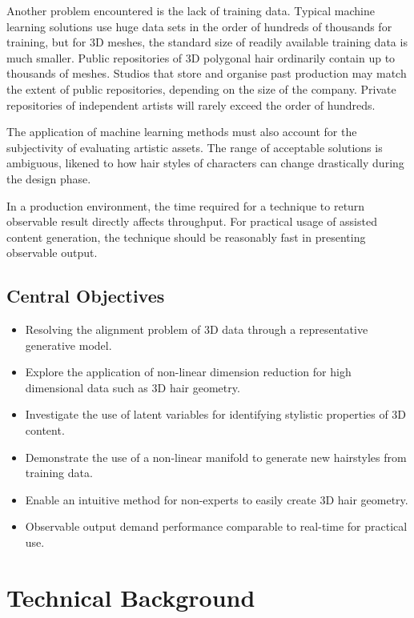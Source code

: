 \documentclass[ %
author={Dillon Keith Diep},
supervisor={Dr. Carl Henrik Ek},
degree={MEng},
title={ART-CG:},
subtitle={Assisted Real-time Content Generation of 3D Hair by Learning Manifolds},
type={Research},
year={2017} ]{dissertation}
\begin{document}
Another problem encountered is the lack of training data. Typical machine learning solutions use huge data sets in the order of hundreds of thousands for training, but for 3D meshes, the standard size of readily available training data is much smaller. Public repositories of 3D polygonal hair ordinarily contain up to thousands of meshes. \cite{tsr} Studios that store and organise past production may match the extent of public repositories, depending on the size of the company. Private repositories of independent artists will rarely exceed the order of hundreds.

The application of machine learning methods must also account for the subjectivity of evaluating artistic assets. The range of acceptable solutions is ambiguous, likened to how hair styles of characters can change drastically during the design phase.

In a production environment, the time required for a technique to return observable result directly affects throughput. For practical usage of assisted content generation, the technique should be reasonably fast in presenting observable output.

\section{Central Objectives}
\begin{itemize}
	\item Resolving the alignment problem of 3D data through a representative generative model.
	\item Explore the application of non-linear dimension reduction for high dimensional data such as 3D hair geometry.
	\item Investigate the use of latent variables for identifying stylistic properties of 3D content.
	\item Demonstrate the use of a non-linear manifold to generate new hairstyles from training data.
	\item Enable an intuitive method for non-experts to easily create 3D hair geometry.
	\item Observable output demand performance comparable to real-time for practical use.
\end{itemize}


\chapter{Technical Background}
\label{chap:technical}
\end{document}
